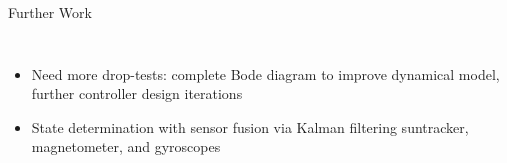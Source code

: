 \documentclass[slidestop,compress]{beamer}
\begin{document}
\begin{frame}[plain]
\begin{block}{\centering Further Work}

\begin{columns}
\begin{itemize}
\item Need more drop-tests: complete Bode diagram to improve dynamical model, further controller design iterations
\item State determination with sensor fusion via Kalman filtering suntracker, magnetometer, and gyroscopes
\end{itemize}
\end{columns}
\end{block}    
\end{frame}
\end{document}
